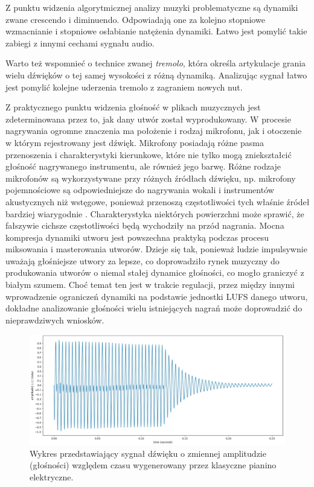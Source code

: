 \documentclass[12pt,a4paper,twoside]{mwart}
\begin{document}
Z punktu widzenia algorytmicznej analizy muzyki problematyczne są dynamiki zwane crescendo i diminuendo. Odpowiadają one za kolejno stopniowe wzmacnianie i stopniowe osłabianie natężenia dynamiki. Łatwo jest pomylić takie zabiegi z innymi cechami sygnału audio.

Warto też wspomnieć o technice zwanej \textit{tremolo}, która określa artykulacje  grania wielu dźwięków o tej samej wysokości z różną dynamiką. Analizując sygnał łatwo jest pomylić kolejne uderzenia tremolo z zagraniem nowych nut.

Z praktycznego punktu widzenia głośność w plikach muzycznych jest zdeterminowana przez to, jak dany utwór został wyprodukowany. W procesie nagrywania ogromne znaczenia ma położenie i rodzaj mikrofonu, jak i otoczenie w którym rejestrowany jest dźwięk. Mikrofony posiadają różne pasma przenoszenia i charakterystyki kierunkowe, które nie tylko mogą zniekształcić głośność nagrywanego instrumentu, ale również jego barwę. Różne rodzaje mikrofonów są wykorzystywane przy różnych źródłach dźwięku, np. mikrofony pojemnościowe są odpowiedniejsze do nagrywania wokali i instrumentów akustycznych niż wstęgowe, ponieważ przenoszą częstotliwości tych właśnie źródeł bardziej wiarygodnie \cite[48-52]{Homerecording:DlaKazdego}. Charakterystyka niektórych powierzchni może sprawić, że fałszywie cichsze częstotliwości będą wychodziły na przód nagrania. Mocna kompresja dynamiki utworu jest powszechna praktyką podczas procesu miksowania i masterowania utworów. Dzieje się tak, ponieważ ludzie impulsywnie uważają głośniejsze utwory za lepsze, co doprowadziło rynek muzyczny do produkowania utworów o niemal stałej dynamice głośności, co mogło graniczyć z białym szumem. Choć temat ten jest w trakcie regulacji, przez między innymi wprowadzenie ograniczeń dynamiki na podstawie jednostki LUFS danego utworu, dokładne analizowanie głośności wielu istniejących nagrań może doprowadzić do nieprawdziwych wniosków.

\begin{figure}[H]
  \begin{center}
    \includegraphics[scale=0.32]{images/Amplitude.jpg}
    \caption{Wykres przedstawiający sygnał dźwięku o zmiennej amplitudzie (głośności) względem czasu wygenerowany przez klasyczne pianino elektryczne.}
    \label{fig:amplitude}
  \end{center}
\end{figure}
\end{document}
